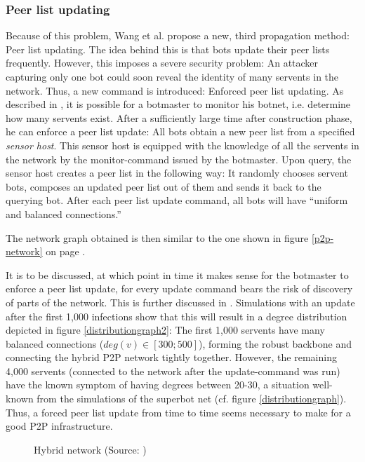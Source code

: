\documentclass{llncs}
\begin{document}
\subsubsection{Peer list updating}
Because of this problem, Wang et al. propose a new, third propagation
method: Peer list updating. The idea behind this is that bots update
their peer lists frequently. However, this imposes a severe security
problem: An attacker capturing only one bot could soon reveal the
identity of many servents in the network. Thus, a new command is
introduced: Enforced peer list updating. As described in \cite{td1sc},
it is possible for a botmaster to monitor his botnet, i.e. determine
how many servents exist. After a sufficiently large time after
construction phase, he can enforce a peer list update: All bots obtain
a new peer list from a specified {\it sensor host}. This sensor host
is equipped with the knowledge of all the servents in the network by
the monitor-command issued by the botmaster. Upon query, the sensor
host creates a peer list in the following way: It randomly chooses
servent bots, composes an updated peer list out of them and sends it
back to the querying bot. After each peer list update command, all
bots will have ``uniform and balanced connections.''\cite{td1sc}

The network graph obtained is then similar to the one shown in figure
\ref{p2p-network} on page \pageref{p2p-network}.

It is to be discussed, at which point in time it makes sense for the
botmaster to enforce a peer list update, for every update command
bears the risk of discovery of parts of the network. This is further
discussed in \cite{td1sc}. Simulations with an update after the first
1,000 infections show that this will result in a degree distribution
depicted in figure \ref{distributiongraph2}: The first 1,000 servents
have many balanced connections ($deg(v) \in [300;500]$), forming the
robust backbone and connecting the hybrid P2P network tightly
together. However, the remaining 4,000 servents (connected to the
network after the update-command was run) have the known symptom of
having degrees between 20-30, a situation well-known from the
simulations of the superbot net (cf. figure
\ref{distributiongraph}). Thus, a forced peer list update from time to
time seems necessary to make for a good P2P infrastructure.

\begin{figure}[htbp]
  \centering
  \caption{Hybrid network (Source: \cite{td1sc})}
  \label{hybrid-network}
\end{figure}
\end{document}
